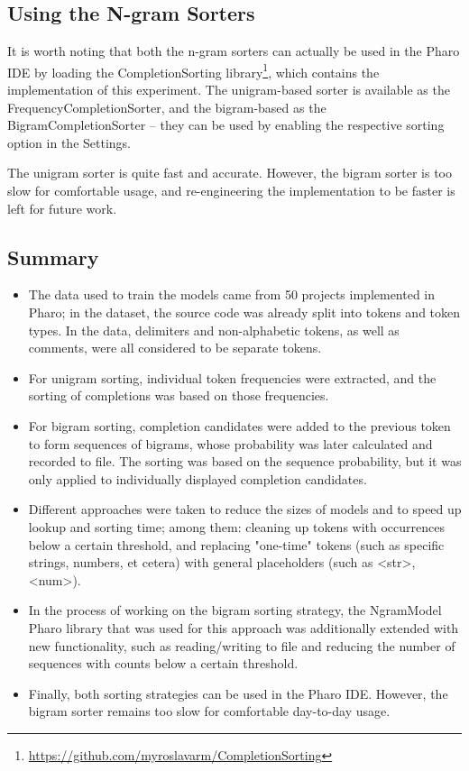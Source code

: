 \documentclass[sigplan,screen]{acmart}
\begin{document}
\subsection{Using the N-gram Sorters}
It is worth noting that both the n-gram sorters can actually be used in the Pharo IDE by loading the CompletionSorting library\footnote{\url{https://github.com/myroslavarm/CompletionSorting}}, which contains the implementation of this experiment. The unigram-based sorter is available as the FrequencyCompletionSorter, and the bigram-based as the BigramCompletionSorter -- they can be used by enabling the respective sorting option in the Settings.

The unigram sorter is quite fast and accurate. However, the bigram sorter is too slow for comfortable usage, and re-engineering the implementation to be faster is left for future work.

\subsection{Summary}
\begin{itemize}
    \item The data used to train the models came from 50 projects implemented in Pharo; in the dataset, the source code was already split into tokens and token types. In the data, delimiters and non-alphabetic tokens, as well as comments, were all considered to be separate tokens.
    \item For unigram sorting, individual token frequencies were extracted, and the sorting of completions was based on those frequencies.
    \item For bigram sorting, completion candidates were added to the previous token to form sequences of bigrams, whose probability was later calculated and recorded to file. The sorting was based on the sequence probability, but it was only applied to individually displayed completion candidates.
    \item Different approaches were taken to reduce the sizes of models and to speed up lookup and sorting time; among them: cleaning up tokens with occurrences below a certain threshold, and replacing "one-time" tokens (such as specific strings, numbers, et cetera) with general placeholders (such as <str>, <num>).
    \item In the process of working on the bigram sorting strategy, the NgramModel Pharo library that was used for this approach was additionally extended with new functionality, such as reading/writing to file and reducing the number of sequences with counts below a certain threshold.
    \item Finally, both sorting strategies can be used in the Pharo IDE. However, the bigram sorter remains too slow for comfortable day-to-day usage.
\end{itemize}
\end{document}

